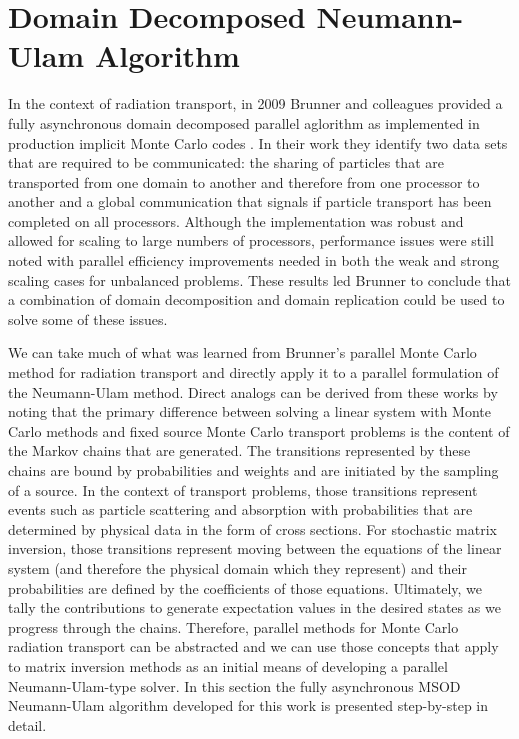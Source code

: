 \clearpage

\section{Domain Decomposed Neumann-Ulam Algorithm}
\label{sec:asynchronous_algorithm}
In the context of radiation transport, in 2009 Brunner and colleagues
provided a fully asynchronous domain decomposed parallel aglorithm as
implemented in production implicit Monte Carlo codes
\citep{brunner_efficient_2009}. In their work they identify two data
sets that are required to be communicated: the sharing of particles
that are transported from one domain to another and therefore from one
processor to another and a global communication that signals if
particle transport has been completed on all processors. Although the
implementation was robust and allowed for scaling to large numbers of
processors, performance issues were still noted with parallel
efficiency improvements needed in both the weak and strong scaling
cases for unbalanced problems. These results led Brunner to conclude
that a combination of domain decomposition and domain replication
could be used to solve some of these issues.

We can take much of what was learned from Brunner's parallel Monte
Carlo method for radiation transport and directly apply it to a
parallel formulation of the Neumann-Ulam method. Direct analogs can be
derived from these works by noting that the primary difference between
solving a linear system with Monte Carlo methods and fixed source
Monte Carlo transport problems is the content of the Markov chains
that are generated. The transitions represented by these chains are
bound by probabilities and weights and are initiated by the sampling
of a source. In the context of transport problems, those transitions
represent events such as particle scattering and absorption with
probabilities that are determined by physical data in the form of
cross sections. For stochastic matrix inversion, those transitions
represent moving between the equations of the linear system (and
therefore the physical domain which they represent) and their
probabilities are defined by the coefficients of those
equations. Ultimately, we tally the contributions to generate
expectation values in the desired states as we progress through the
chains. Therefore, parallel methods for Monte Carlo radiation
transport can be abstracted and we can use those concepts that apply
to matrix inversion methods as an initial means of developing a
parallel Neumann-Ulam-type solver. In this section the fully
asynchronous MSOD Neumann-Ulam algorithm developed for this work is
presented step-by-step in detail.

